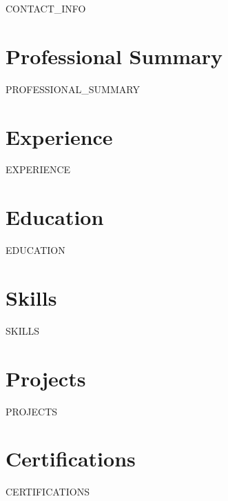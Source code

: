 \documentclass[letterpaper,11pt]{article}
\begin{document}
{{CONTACT_INFO}}

\section{Professional Summary}
{{PROFESSIONAL_SUMMARY}}

\section{Experience}
{{EXPERIENCE}}

\section{Education}
{{EDUCATION}}

\section{Skills}
{{SKILLS}}

\section{Projects}
{{PROJECTS}}

\section{Certifications}
{{CERTIFICATIONS}}
\end{document}
